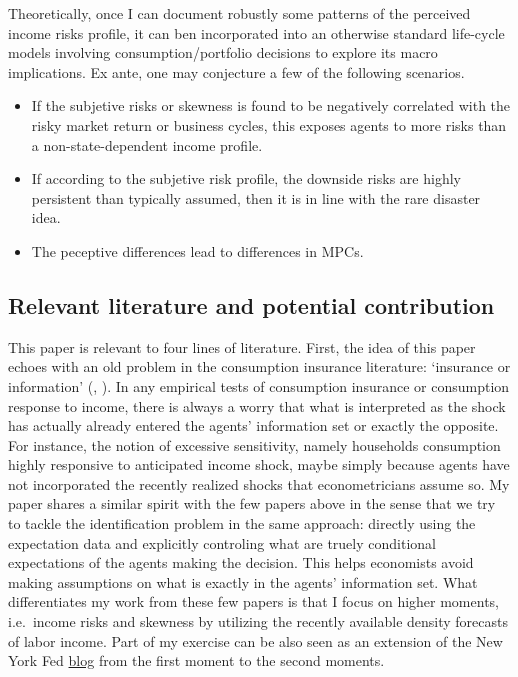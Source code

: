 \documentclass[12pt,notitlepage,onecolumn,aps,pra]{revtex4-1}
\begin{document}
Theoretically, once I can document robustly some patterns of the
perceived income risks profile, it can ben incorporated into an
otherwise standard life-cycle models involving consumption/portfolio
decisions to explore its macro implications. Ex ante, one may conjecture
a few of the following scenarios.

\begin{itemize}
\item
  If the subjetive risks or skewness is found to be negatively
  correlated with the risky market return or business cycles, this
  exposes agents to more risks than a non-state-dependent income
  profile.
\item
  If according to the subjetive risk profile, the downside risks are
  highly persistent than typically assumed, then it is in line with the
  rare disaster idea.
\item
  The peceptive differences lead to differences in MPCs.
\end{itemize}

\hypertarget{relevant-literature-and-potential-contribution}{%
\subsection{Relevant literature and potential
contribution}\label{relevant-literature-and-potential-contribution}}

This paper is relevant to four lines of literature. First, the idea of
this paper echoes with an old problem in the consumption insurance
literature: `insurance or information' (\cite{pistaferri_superior_2001},
\cite{kaufmann_disentangling_2009}). In any empirical tests of
consumption insurance or consumption response to income, there is always
a worry that what is interpreted as the shock has actually already
entered the agents' information set or exactly the opposite. For
instance, the notion of excessive sensitivity, namely households
consumption highly responsive to anticipated income shock, maybe simply
because agents have not incorporated the recently realized shocks that
econometricians assume so. My paper shares a similar spirit with the few
papers above in the sense that we try to tackle the identification
problem in the same approach: directly using the expectation data and
explicitly controling what are truely conditional expectations of the
agents making the decision. This helps economists avoid making
assumptions on what is exactly in the agents' information set. What
differentiates my work from these few papers is that I focus on higher
moments, i.e.~income risks and skewness by utilizing the recently
available density forecasts of labor income. Part of my exercise can be
also seen as an extension of the New York Fed
\href{https://libertystreeteconomics.newyorkfed.org/2017/11/understanding-permanent-and-temporary-income-shocks.html}{blog}
from the first moment to the second moments.
\end{document}
